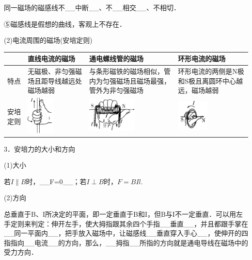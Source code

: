 同一磁场的磁感线不\_\_中断\_\_、不\_\_相交\_\_、不相切．

⑤磁感线是假想的曲线，客观上不存在．

(2)电流周围的磁场(安培定则)

\begin{longtable}[]{@{}m{2cm}m{3cm}m{3cm}m{3cm}@{}}
\toprule
 & \begin{minipage}[b]{0.22\columnwidth}\raggedright
直线电流的磁场\strut
\end{minipage} & \begin{minipage}[b]{0.22\columnwidth}\raggedright
通电螺线管的磁场\strut
\end{minipage} & \begin{minipage}[b]{0.22\columnwidth}\raggedright
环形电流的磁场\strut
\end{minipage}\tabularnewline
\midrule
\endhead
特点 & 无磁极、非匀强磁场且距导线越远处磁场越弱 &
与条形磁铁的磁场相似，管内为匀强磁场且磁场最强，管外为非匀强磁场 &
环形电流的两侧是N极和S极且离圆环中心越远，磁场越弱\tabularnewline
安培定则 &
\includegraphics[width=0.54722in,height=0.75486in]{media/image336.png} &
\includegraphics[width=0.98125in,height=0.68889in]{media/image337.png} &
\includegraphics[width=0.63194in,height=0.61319in]{media/image338.png}\tabularnewline
\bottomrule
\end{longtable}

3．安培力的大小和方向

(1)大小

若$I\parallel B$时，\_\_F=0\_\_；若$I\perp B$时，$F=BIl$.

(2)方向

总垂直于B、I所决定的平面，即一定垂直于B和I，但B与I不一定垂直．可以用左手定则来判定：伸开左手，使大拇指跟其余四个手指\_\_垂直\_\_，并且都跟手掌在\_\_同一平面内\_\_，把手放入磁场中，让磁感线\_\_垂直穿入手心\_\_，使伸开的四指指向\_\_电流\_\_的方向，那么，\_\_拇指\_\_所指的方向就是通电导线在磁场中的受力方向．


